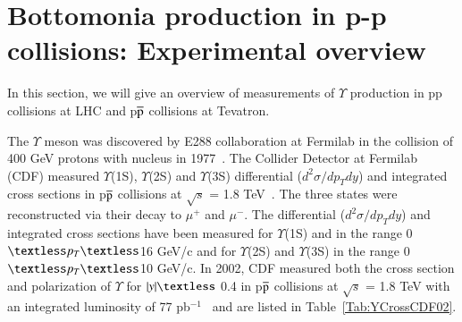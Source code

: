 
\section{Bottomonia production in p-p collisions: Experimental overview}


 In this section, we will give an overview of measurements of $\Upsilon$
production in pp collisions at LHC and p$\overline{\rm p}$ collisions at Tevatron. 


The $\Upsilon$ meson was discovered by E288 collaboration at Fermilab in the collision of
400 GeV protons with nucleus in 1977~\cite{PhysRevLett.39.252}.
The Collider Detector at Fermilab (CDF) measured $\Upsilon$(1S), $\Upsilon$(2S) and $\Upsilon$(3S) 
differential ($d^{2}\sigma/dp_{T}dy$) and integrated cross sections in p$\overline{\rm p}$ collisions at
$\surd s$ = 1.8 TeV~\cite{CDF:1995gwi}. The three states were reconstructed via their decay 
to $\mu^{+}$ and $\mu^{-}$. The differential ($d^{2}\sigma/dp_{T}dy$) and integrated
cross sections have been measured for  $\Upsilon$(1S) and in the range
0$\textless p_{T} \textless$16 GeV/c and for $\Upsilon$(2S) and $\Upsilon$(3S)
in the range 0$\textless p_{T}\textless$10 GeV/c.
  In 2002, CDF measured both the cross section and polarization of $\Upsilon$
for $|y|\textless$ 0.4 in p$\overline{\rm p}$ collisions at $\surd s$ = 1.8 TeV with
an integrated luminosity of 77 pb$^{-1}$~\cite{CDF:2001fdy} and are
listed in Table~\ref{Tab:YCrossCDF02}.



